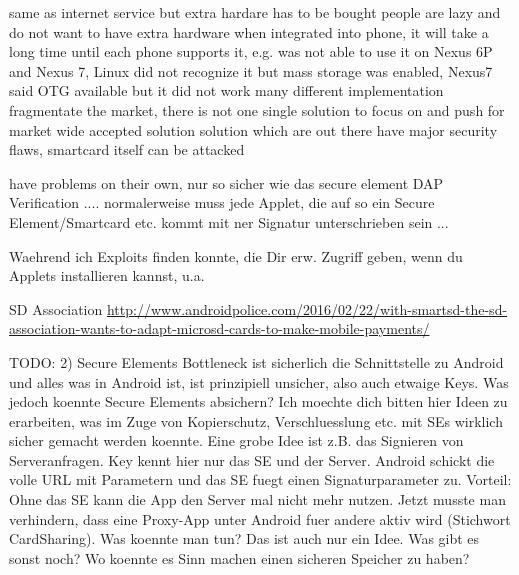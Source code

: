 same as internet service but extra hardare has to be bought
people are lazy and do not want to have extra hardware
when integrated into phone, it will take a long time until each phone supports it, e.g. was not able to use it on Nexus 6P and Nexus 7, Linux did not recognize it but mass storage was enabled, Nexus7 said OTG available but it did not work
many different implementation fragmentate the market, there is not one single solution to focus on and push for market wide accepted solution
solution which are out there have major security flaws, smartcard itself can be attacked

have problems on their own, nur so sicher wie das secure element
DAP Verification .... normalerweise muss jede Applet, die auf so ein Secure Element/Smartcard etc. kommt mit ner Signatur unterschrieben sein ...


Waehrend ich Exploits finden konnte, die Dir erw. Zugriff geben, wenn du Applets installieren kannst, u.a.

SD Association
\url{http://www.androidpolice.com/2016/02/22/with-smartsd-the-sd-association-wants-to-adapt-microsd-cards-to-make-mobile-payments/}





TODO:
2) Secure Elements
Bottleneck ist sicherlich die Schnittstelle zu Android und alles was in Android ist, ist prinzipiell unsicher, also auch etwaige Keys. Was jedoch koennte Secure Elements absichern? Ich moechte dich bitten hier Ideen zu erarbeiten, was im Zuge von Kopierschutz,  Verschluesslung etc. mit SEs wirklich sicher gemacht werden koennte. Eine grobe Idee ist z.B. das Signieren von Serveranfragen. Key kennt hier nur das SE und der Server. Android schickt die volle URL mit Parametern und das SE fuegt einen Signaturparameter zu. Vorteil: Ohne das SE kann die App den Server mal nicht mehr nutzen. Jetzt musste man verhindern, dass eine Proxy-App unter Android fuer andere aktiv wird (Stichwort CardSharing). Was koennte man tun? Das ist auch nur ein Idee. Was gibt es sonst noch? Wo koennte es Sinn machen einen sicheren Speicher zu haben?
